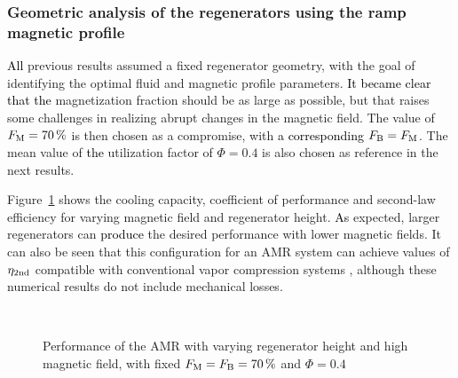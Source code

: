 \documentclass[referee]{svjour3}
\begin{document}
\subsubsection{Geometric analysis of the regenerators using the ramp magnetic profile}
\label{sec:geom-analys-regen}

\textcolor{black}{All} previous results assumed a fixed regenerator geometry, with the goal of identifying the optimal fluid and magnetic profile parameters. \textcolor{black}{It became clear that the} magnetization fraction should be as large as possible, but that raises some challenges in realizing abrupt changes in the magnetic field. The value of $F_{\mathrm{M}} = \SI{70}{\percent}$ is then chosen as a compromise, with \textcolor{black}{a corresponding} $F_{\mathrm{B}} = F_{\mathrm{M}}$. The mean value of \textcolor{black}{the} utilization factor of $\Phi = 0.4$ is also chosen as reference in the next results.

Figure~\ref{fig:qc-cop-eta-amr-height} shows the cooling capacity, coefficient of performance and second-law efficiency for varying magnetic field and regenerator height. \textcolor{black}{As} expected, larger regenerators can \textcolor{black}{produce} the desired performance with lower magnetic fields. It can also be seen that this configuration for an AMR system can achieve values of $\eta_{\mathrm{2nd}}$ compatible with conventional vapor compression systems \cite{HERMES20081341,NEGRAO20113051}, although these numerical results do not include mechanical losses.

\begin{figure}[!ht]
  \centering
{}
\,
  \caption{Performance of the AMR with varying regenerator height and high magnetic field, with fixed $F_{\mathrm{M}} = F_{\mathrm{B}} = \SI{70}{\percent}$ and $\Phi = 0.4$}
  \label{fig:qc-cop-eta-amr-height}
\end{figure}
\end{document}
